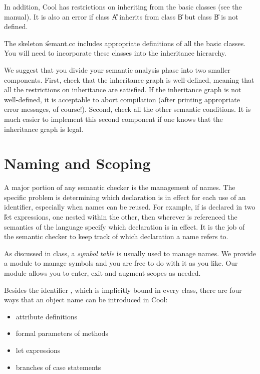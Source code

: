 In addition, Cool has restrictions on inheriting from the basic classes
(see the manual).  It is also an error if class \U{A}
inherits from class \U{B} but class \U{B} is not defined.

The skeleton \U{semant.cc} includes appropriate definitions of all the
basic classes. You will need to incorporate these classes into the
inheritance hierarchy.

We suggest that you divide your semantic analysis phase into two
smaller components.  First, check that the inheritance graph is
well-defined, meaning that all the restrictions on inheritance are
satisfied.  If the inheritance graph is not well-defined, it is
acceptable to abort compilation (after printing appropriate error
messages, of course!).  Second, check all the other semantic
conditions.  It is much easier to implement this second component if
one knows that the inheritance graph is legal.


\section{Naming and Scoping}

A major portion of any semantic checker is the management of names.
The specific problem is determining which declaration is in effect for
each use of an identifier, especially when names can be reused. For
example, if  is declared in two \U{let} expressions, one nested within the
other, then wherever  is referenced  the semantics of the language
specify which declaration is in effect.  It is the job of the semantic
checker to keep track of which declaration a name refers to.

As discussed in class, a {\em symbol table} is usually used to manage names.
We provide a module to manage symbols and you
are free to do with it as you like. Our module allows you to enter, exit
and augment scopes as needed.

Besides the identifier , which is implicitly bound in every class,
there are four ways that an object name can be introduced in Cool:
\begin{itemize}
\item attribute definitions

\item formal parameters of methods

\item let expressions

\item branches of case statements
\end{itemize}

